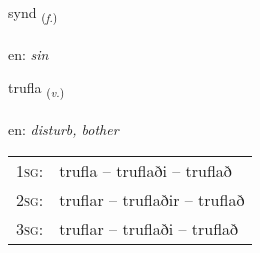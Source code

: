 \documentclass[frontgrid, backgrid]{flacards}\usepackage[]{graphicx}\usepackage[]{xcolor}
\begin{document}
\renewcommand{\flhead}{\vskip5pt \fboxsep=0pt {\small\bfseries\footnotesize Nafnorð | Noun}}
\renewcommand{\fcfoot}{\vskip5pt \fboxsep=0pt \hspace{2pt}{\small\bfseries\footnotesize 3K}}

\renewcommand{\blhead}{\vskip5pt {\small\bfseries\footnotesize Nafnorð | Noun }}
\renewcommand{\bcfoot}{\vskip5pt \hspace{2pt}{\small\bfseries\footnotesize 3K}}


{synd \small{\textsubscript{(\textit{f.})}} \\[1ex] %
\textphonetic{[sɪnt]} \\
en: \emph{sin} \\  [2ex]
\renewcommand*{\arraystretch}{0.8}
}

\renewcommand{\flhead}{\vskip5pt \fboxsep=0pt {\small\bfseries\footnotesize Sagnorð | Verb}}
\renewcommand{\fcfoot}{\vskip5pt \fboxsep=0pt \hspace{2pt}{\small\bfseries\footnotesize 3K}}

\renewcommand{\blhead}{\vskip5pt {\small\bfseries\footnotesize Sagnorð | Verb }}
\renewcommand{\bcfoot}{\vskip5pt \hspace{2pt}{\small\bfseries\footnotesize 3K}}


{trufla \small{\textsubscript{(\textit{v.})}} \\[1ex] %
\textphonetic{[tʰrʏpla]} \\
en: \emph{disturb, bother} \\  [2ex]
\renewcommand*{\arraystretch}{0.8}
\begin{tabular}{p{1cm}l}
\textsc{1sg}: & trufla -- truflaði -- truflað \\ 
\textsc{2sg}: & truflar -- truflaðir -- truflað \\ 
\textsc{3sg}: & truflar -- truflaði -- truflað \\ 
\end{tabular}
}
\end{document}
